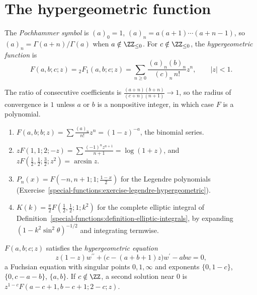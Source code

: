 \section{The hypergeometric function}\label{special-functions:section-hypergeometric}

\begin{definition}\label{special-functions:definition-hypergeometric}
The \emph{Pochhammer symbol} is $(a)_0 = 1$, $(a)_n = a(a + 1)\cdots(a + n - 1)$, so $(a)_n = \Gamma(a + n)/\Gamma(a)$ when $a \notin \ZZ_{\leq 0}$. For $c \notin \ZZ_{\leq 0}$, the \emph{hypergeometric function} is
\[
F(a, b; c; z) = {}_2F_1(a, b; c; z) = \sum_{n \geq 0}\frac{(a)_n(b)_n}{(c)_n\,n!}z^n, \qquad |z| < 1.
\]
\end{definition}

The ratio of consecutive coefficients is $\frac{(a + n)(b + n)}{(c + n)(n + 1)} \to 1$, so the radius of convergence is $1$ unless $a$ or $b$ is a nonpositive integer, in which case $F$ is a polynomial.

\begin{example}\label{special-functions:example-hypergeometric}
\begin{enumerate}
\item $F(a, b; b; z) = \sum\frac{(a)_n}{n!}z^n = (1 - z)^{-a}$, the binomial series.
\item $zF(1, 1; 2; -z) = \sum\frac{(-1)^nz^{n+1}}{n + 1} = \log(1 + z)$, and $zF(\frac12, \frac12; \frac32; z^2) = \arcsin z$.
\item $P_n(x) = F(-n, n + 1; 1; \frac{1 - x}{2})$ for the Legendre polynomials (Exercise~\ref{special-functions:exercise-legendre-hypergeometric}).
\item $K(k) = \frac\pi2F(\frac12, \frac12; 1; k^2)$ for the complete elliptic integral of Definition~\ref{special-functions:definition-elliptic-integrals}, by expanding $(1 - k^2\sin^2\theta)^{-1/2}$ and integrating termwise.
\end{enumerate}
\end{example}

\begin{proposition}\label{special-functions:proposition-hypergeometric-equation}
$F(a, b; c; z)$ satisfies the \emph{hypergeometric equation}
\[
z(1 - z)w^{\prime\prime} + \bigl(c - (a + b + 1)z\bigr)w^{\prime} - abw = 0,
\]
a Fuchsian equation with singular points $0, 1, \infty$ and exponents $\{0, 1 - c\}$, $\{0, c - a - b\}$, $\{a, b\}$. If $c \notin \ZZ$, a second solution near $0$ is $z^{1-c}F(a - c + 1, b - c + 1; 2 - c; z)$.
\end{proposition}

